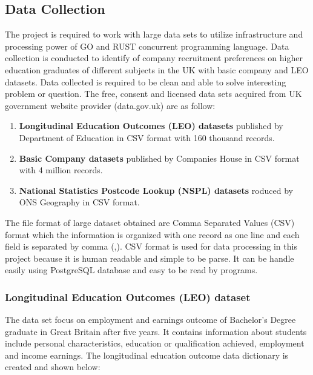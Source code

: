 \pagebreak

\subsection{Data Collection}

The project is required to work with large data sets to utilize infrastructure and processing power of GO and RUST concurrent programming language. Data collection is conducted to identify of company recruitment preferences on higher education graduates of different subjects in the UK with basic company and LEO datasets. Data collected is required to be clean and able to solve interesting problem or question. The free, consent and licensed data sets acquired from UK government website provider (data.gov.uk) are as follow:

\begin{enumerate}[topsep=0pt,itemsep=-1ex,partopsep=1ex,parsep=1.5ex]
	
	\item \textbf{Longitudinal Education Outcomes (LEO) datasets} published by Department of Education in CSV format with 160 thousand records.
	\item \textbf{Basic Company datasets} published by Companies House in CSV format with 4 million records.
	\item \textbf{National Statistics Postcode Lookup (NSPL) datasets} roduced by ONS Geography in CSV format.  
	
\end{enumerate}

The file format of large dataset obtained are Comma Separated Values (CSV) format which the information is organized with one record as one line and each field is separated by comma (,). CSV format is used for data processing in this project because it is human readable and simple to be parse. It can be handle easily using PostgreSQL database and easy to be read by programs. 

\pagebreak

\subsubsection{Longitudinal Education Outcomes (LEO) dataset }

The data set focus on employment and earnings outcome of Bachelor’s Degree graduate in Great Britain after five years. It contains information about students include personal characteristics, education or qualification achieved, employment and income earnings.  The longitudinal education outcome data dictionary is created and shown below: 

